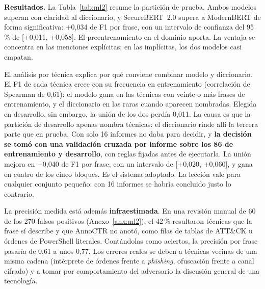 \medskip\noindent\textbf{Resultados.} La Tabla~\ref{tab:ml2} resume la partición de prueba. Ambos modelos superan
con claridad al diccionario, y SecureBERT~2.0 supera a ModernBERT de forma significativa:
+0,034 de F1 por frase, con un intervalo de confianza del 95\,\% de [+0,011, +0,058]. El
preentrenamiento en el dominio aporta. La ventaja se concentra en las menciones explícitas; en
las implícitas, los dos modelos casi empatan.

\begin{table}[H]
\centering
{}
\caption{ML-2 en la partición de prueba de AnnoCTR (media de tres semillas; R: exhaustividad
por mención).}
\label{tab:ml2}
\end{table}

El análisis por técnica explica por qué conviene combinar modelo y diccionario. El F1 de cada
técnica crece con su frecuencia en entrenamiento (correlación de Spearman de 0,61): el modelo gana
en las técnicas con veinte o más frases de entrenamiento, y el diccionario en las raras cuando
aparecen nombradas. Elegida en desarrollo, sin embargo, la unión de los dos perdía 0,011. La causa
es que la partición de desarrollo apenas nombra técnicas: el diccionario rinde allí la tercera
parte que en prueba. Con solo 16 informes no daba para decidir, y \textbf{la decisión se tomó con
una validación cruzada por informe sobre los 86 de entrenamiento y desarrollo}, con reglas fijadas
antes de ejecutarla. La unión mejora en +0,040 de F1 por frase, con un intervalo de [+0,020,
+0,060], y gana en cuatro de los cinco bloques. Es el sistema adoptado. La lección vale para
cualquier conjunto pequeño: con 16 informes se habría concluido justo lo contrario.

La precisión medida está además \textbf{infraestimada}. En una revisión manual de 60 de los 270
falsos positivos (Anexo~\ref{anx:ml2}), el 42\,\% resultaron técnicas que la frase sí describe y
que AnnoCTR no anotó, como filas de tablas de ATT\&CK u órdenes de PowerShell literales. Contándolas
como aciertos, la precisión por frase pasaría de 0,61 a unos 0,77. Los errores reales se deben a
técnicas vecinas de una misma cadena (intérprete de órdenes frente a \textit{phishing}, ofuscación
frente a canal cifrado) y a tomar por comportamiento del adversario la discusión general de una
tecnología.

